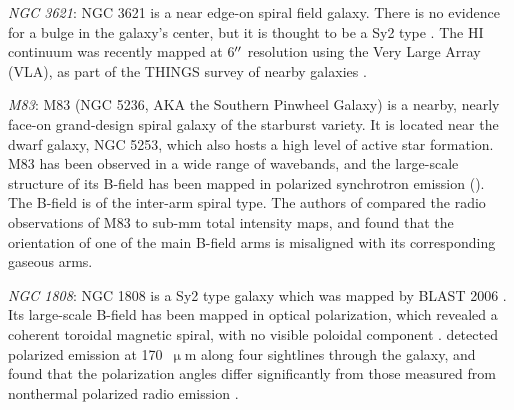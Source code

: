 \vspace{5mm}

\textit{NGC 3621}: NGC 3621 is a near edge-on spiral field galaxy. There is no evidence for a bulge in the galaxy's center, but it is thought to be a Sy2 type \citep{barth2008dynamical}. The HI continuum was recently mapped at 6$\operatorname{^{\prime\prime}}$ resolution using the Very Large Array (VLA), as part of the THINGS survey of nearby galaxies \citep{walter2008things}.

\vspace{5mm}

\textit{M83}: M83 (NGC 5236, AKA the Southern Pinwheel Galaxy) is a nearby, nearly face-on grand-design spiral galaxy of the starburst variety. It is located near the dwarf galaxy, NGC 5253, which also hosts a high level of active star formation. M83 has been observed in a wide range of wavebands, and the large-scale structure of its B-field has been mapped in polarized synchrotron emission (\citet{sukumar1989large,frick2016magnetic}). The B-field is of the inter-arm spiral type. The authors of \citet{frick2016magnetic} compared the radio observations of M83 to sub-mm total intensity maps, and found that the orientation of one of the main B-field arms is misaligned with its corresponding gaseous arms.


\vspace{5mm}

\textit{NGC 1808}: NGC 1808 is a Sy2 type galaxy which was mapped by BLAST 2006 \citep{blastresolved}. Its large-scale B-field has been mapped in optical polarization, which revealed a coherent toroidal magnetic spiral, with no visible poloidal component \citep{scarrott1993imaging}. \citet{siebenmorgen2001infrared} detected polarized emission at 170~$\upmu$m along four sightlines through the galaxy, and found that the polarization angles differ significantly from those measured from nonthermal polarized radio emission \citep{siebenmorgen2001infrared}.



